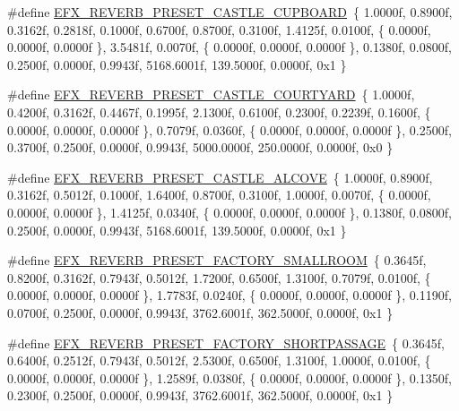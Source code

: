 \begin{DoxyCompactItemize}
\item 
\#define \hyperlink{efx-presets_8h_aea087279f39010f8ba13a8ae746c741d}{E\+F\+X\+\_\+\+R\+E\+V\+E\+R\+B\+\_\+\+P\+R\+E\+S\+E\+T\+\_\+\+C\+A\+S\+T\+L\+E\+\_\+\+C\+U\+P\+B\+O\+A\+RD}~\{ 1.\+0000f, 0.\+8900f, 0.\+3162f, 0.\+2818f, 0.\+1000f, 0.\+6700f, 0.\+8700f, 0.\+3100f, 1.\+4125f, 0.\+0100f, \{ 0.\+0000f, 0.\+0000f, 0.\+0000f \}, 3.\+5481f, 0.\+0070f, \{ 0.\+0000f, 0.\+0000f, 0.\+0000f \}, 0.\+1380f, 0.\+0800f, 0.\+2500f, 0.\+0000f, 0.\+9943f, 5168.\+6001f, 139.\+5000f, 0.\+0000f, 0x1 \}
\item 
\#define \hyperlink{efx-presets_8h_a657914b06a7a4bcefcfc00635fce1673}{E\+F\+X\+\_\+\+R\+E\+V\+E\+R\+B\+\_\+\+P\+R\+E\+S\+E\+T\+\_\+\+C\+A\+S\+T\+L\+E\+\_\+\+C\+O\+U\+R\+T\+Y\+A\+RD}~\{ 1.\+0000f, 0.\+4200f, 0.\+3162f, 0.\+4467f, 0.\+1995f, 2.\+1300f, 0.\+6100f, 0.\+2300f, 0.\+2239f, 0.\+1600f, \{ 0.\+0000f, 0.\+0000f, 0.\+0000f \}, 0.\+7079f, 0.\+0360f, \{ 0.\+0000f, 0.\+0000f, 0.\+0000f \}, 0.\+2500f, 0.\+3700f, 0.\+2500f, 0.\+0000f, 0.\+9943f, 5000.\+0000f, 250.\+0000f, 0.\+0000f, 0x0 \}
\item 
\#define \hyperlink{efx-presets_8h_adde71ddbf4797faa9b58d4b5f7314f56}{E\+F\+X\+\_\+\+R\+E\+V\+E\+R\+B\+\_\+\+P\+R\+E\+S\+E\+T\+\_\+\+C\+A\+S\+T\+L\+E\+\_\+\+A\+L\+C\+O\+VE}~\{ 1.\+0000f, 0.\+8900f, 0.\+3162f, 0.\+5012f, 0.\+1000f, 1.\+6400f, 0.\+8700f, 0.\+3100f, 1.\+0000f, 0.\+0070f, \{ 0.\+0000f, 0.\+0000f, 0.\+0000f \}, 1.\+4125f, 0.\+0340f, \{ 0.\+0000f, 0.\+0000f, 0.\+0000f \}, 0.\+1380f, 0.\+0800f, 0.\+2500f, 0.\+0000f, 0.\+9943f, 5168.\+6001f, 139.\+5000f, 0.\+0000f, 0x1 \}
\item 
\#define \hyperlink{efx-presets_8h_a8b506e3ba97654c5fa50fe5c37b732d9}{E\+F\+X\+\_\+\+R\+E\+V\+E\+R\+B\+\_\+\+P\+R\+E\+S\+E\+T\+\_\+\+F\+A\+C\+T\+O\+R\+Y\+\_\+\+S\+M\+A\+L\+L\+R\+O\+OM}~\{ 0.\+3645f, 0.\+8200f, 0.\+3162f, 0.\+7943f, 0.\+5012f, 1.\+7200f, 0.\+6500f, 1.\+3100f, 0.\+7079f, 0.\+0100f, \{ 0.\+0000f, 0.\+0000f, 0.\+0000f \}, 1.\+7783f, 0.\+0240f, \{ 0.\+0000f, 0.\+0000f, 0.\+0000f \}, 0.\+1190f, 0.\+0700f, 0.\+2500f, 0.\+0000f, 0.\+9943f, 3762.\+6001f, 362.\+5000f, 0.\+0000f, 0x1 \}
\item 
\#define \hyperlink{efx-presets_8h_affa348a7c6bf72fbc9eca06a9d1815ec}{E\+F\+X\+\_\+\+R\+E\+V\+E\+R\+B\+\_\+\+P\+R\+E\+S\+E\+T\+\_\+\+F\+A\+C\+T\+O\+R\+Y\+\_\+\+S\+H\+O\+R\+T\+P\+A\+S\+S\+A\+GE}~\{ 0.\+3645f, 0.\+6400f, 0.\+2512f, 0.\+7943f, 0.\+5012f, 2.\+5300f, 0.\+6500f, 1.\+3100f, 1.\+0000f, 0.\+0100f, \{ 0.\+0000f, 0.\+0000f, 0.\+0000f \}, 1.\+2589f, 0.\+0380f, \{ 0.\+0000f, 0.\+0000f, 0.\+0000f \}, 0.\+1350f, 0.\+2300f, 0.\+2500f, 0.\+0000f, 0.\+9943f, 3762.\+6001f, 362.\+5000f, 0.\+0000f, 0x1 \}

\end{DoxyCompactItemize}
